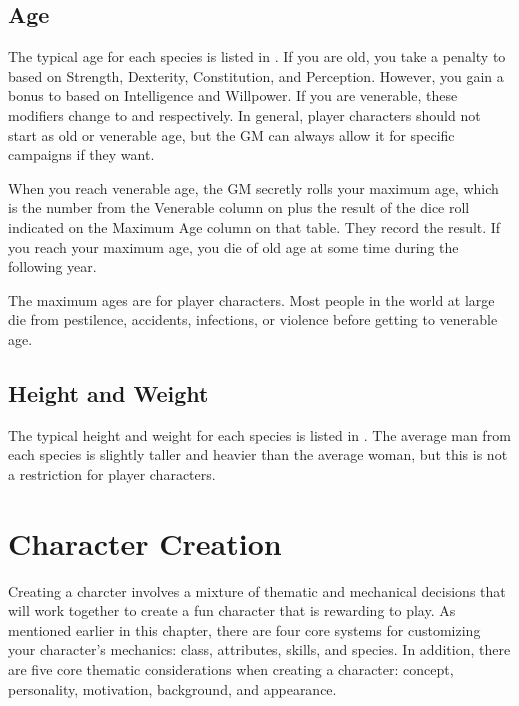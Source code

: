     \subsection{Age}
        The typical age for each species is listed in .
        If you are old, you take a  penalty to  based on Strength, Dexterity, Constitution, and Perception.
        However, you gain a  bonus to  based on Intelligence and Willpower.
        If you are venerable, these modifiers change to  and  respectively.
        In general, player characters should not start as old or venerable age, but the GM can always allow it for specific campaigns if they want.

        When you reach venerable age, the GM secretly rolls your maximum age, which is the number from the Venerable column on  plus the result of the dice roll indicated on the Maximum Age column on that table.
        They record the result.
        If you reach your maximum age, you die of old age at some time during the following year.

        The maximum ages are for player characters. Most people in the world at large die from pestilence, accidents, infections, or violence before getting to venerable age.

    \subsection{Height and Weight}
        The typical height and weight for each species is listed in .
        The average man from each species is slightly taller and heavier than the average woman, but this is not a restriction for player characters.

\section{Character Creation}\label{Character Creation}

    Creating a charcter involves a mixture of thematic and mechanical decisions that will work together to create a fun character that is rewarding to play.
    As mentioned earlier in this chapter, there are four core systems for customizing your character's mechanics: class, attributes, skills, and species.
    In addition, there are five core thematic considerations when creating a character: concept, personality, motivation, background, and appearance.

